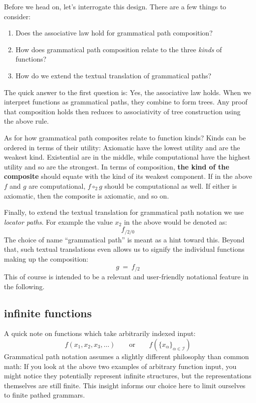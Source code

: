 \documentclass[twoside]{article}
\newcommand{\strong}[1]{{\bfseries #1}}
\begin{document}
Before we head on, let's interrogate this design. There are a few things to consider:

\begin{enumerate}
\item Does the associative law hold for grammatical path composition?
\item How does grammatical path composition relate to the three \emph{kinds} of functions?
\item How do we extend the textual translation of grammatical paths?
\end{enumerate}

The quick answer to the first question is: Yes, the associative law holds. When we interpret functions as grammatical
paths, they combine to form trees. Any proof that composition holds then reduces to associativity of tree
construction using the above rule.

As for how grammatical path composites relate to function kinds? Kinds can be ordered in terms of their utility:
Axiomatic have the lowest utility and are the weakest kind. Existential are in the middle, while computational have
the highest utility and so are the strongest. In terms of composition, \strong{the kind of the composite} should
equate with the kind of its weakest component. If in the above $ f $ and $ g $ are computational, $ f \circ_2 g $
should be computational as well. If either is axiomatic, then the composite is axiomatic, and so on.

Finally, to extend the textual translation for grammatical path notation we use \emph{locator paths}.
For example the value $ x_2 $ in the above would be denoted as:
$$ f_{/2/0} $$
The choice of name ``grammatical path'' is meant as a hint toward this. Beyond that, such textual translations
even allows us to signify the individual functions making up the composition:
$$ g\ =\ f_{/2} $$
This of course is intended to be a relevant and user-friendly notational feature in the following.

\subsection*{infinite functions}

A quick note on functions which take arbitrarily indexed input:
$$ f(x_1, x_2, x_3, \ldots) \qquad \mbox{or} \qquad f(\{x_\alpha\}_{\alpha\in\mathcal{I}}) $$
Grammatical path notation assumes a slightly different philosophy than common math: If you look at the above
two examples of arbitrary function input, you might notice they potentially represent infinite structures,
but the representations themselves are still finite. This insight informs our choice here to limit ourselves
to finite pathed grammars.
\end{document}
